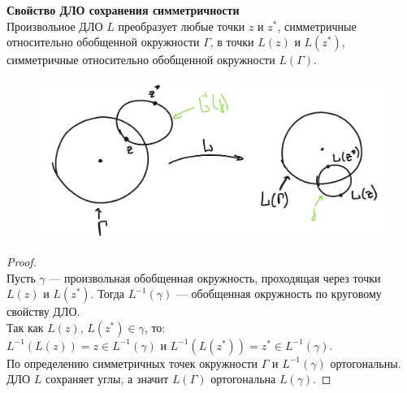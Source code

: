 \textbf{Свойство ДЛО сохранения симметричности}\\
Произвольное ДЛО $L$ преобразует любые точки $z$ и $z^*$, симметричные относительно обобщенной окружности $\Gamma$, в точки $L(z)$ и $L(z^*)$, симметричные относительно обобщенной окружности $L(\Gamma)$.

\begin{figure}[!ht]
    \begin{center}
    \includegraphics[scale=0.4]{answers/img/ans8.png}
    \label{pic08}
    \end{center}
\end{figure}

\begin{proof}
    \ \\
    Пусть $\gamma$ --- произвольная обобщенная окружность, проходящая через точки $L(z)$ и $L(z^*)$. Тогда $L^{-1}(\gamma)$ --- обобщенная окружность по круговому свойству ДЛО.\\[2mm]
    Так как $L(z)$, $L(z^*) \in \gamma$, то:\\
    $L^{-1}(L(z))=z \in L^{-1}(\gamma)$ и $L^{-1}(L(z^*))=z^*\in L^{-1}(\gamma)$.\\[2mm]
    По определению симметричных точек окружности $\Gamma$ и $L^{-1}(\gamma)$ ортогональны. ДЛО $L$ сохраняет углы, а значит $L(\Gamma)$ ортогональна $L(\gamma)$. 
\end{proof}